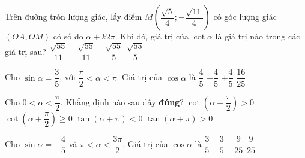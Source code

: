 \begin{ex}%
	Trên đường tròn lượng giác, lấy điểm $M\left(\dfrac{\sqrt{5}}{4};-\dfrac{\sqrt{11}}{4} \right)$ có góc lượng giác $(OA,OM)$ có số đo $\alpha+k2\pi$. Khi đó, giá trị của $\cot \alpha$ là giá  trị nào trong các giá trị sau?
	\choice 
		 {$\dfrac{\sqrt{55}}{11}$}
		 {\True $-\dfrac{\sqrt{55}}{11}$}
		{$-\dfrac{\sqrt{55}}{5}$} 
		 {$\dfrac{\sqrt{55}}{5}$}
\end{ex}

\begin{ex}%
	Cho $\sin \alpha=\dfrac{3}{5}$, với  $\dfrac{\pi}{2} < \alpha < \pi$. Giá trị của $\cos\alpha$ là
	 \choice
		{$\dfrac{4}{5}$} 
		{\True  $-\dfrac{4}{5}$}
		{$\pm \dfrac{4}{5}$} 
		{$\dfrac{16}{25}$} 
\end{ex}

\begin{ex}%
	Cho $0< \alpha < \dfrac{\pi}{2}$. Khẳng định nào sau  đây \textbf{đúng}?
	 \choice
		{$\cot \left(\alpha+\dfrac{\pi}{2} \right) >  0$}
		{$\cot \left(\alpha+\dfrac{\pi}{2} \right)\ge  0$}
		 {$\tan \left(\alpha+\pi \right) < 0$}
		{\True $\tan \left(\alpha+\pi \right) >  0$}
\end{ex}

\begin{ex}%
	Cho $\sin\alpha=-\dfrac{4}{5}$ và $\pi<\alpha<\dfrac{3\pi}{2}$. Giá trị của $\cos\alpha$ là 
	\choice 
		{$\dfrac{3}{5}$} 
		{\True $-\dfrac{3}{5}$} 
		 {$-\dfrac{9}{25}$}
		 {$\dfrac{9}{25}$}
\end{ex}


